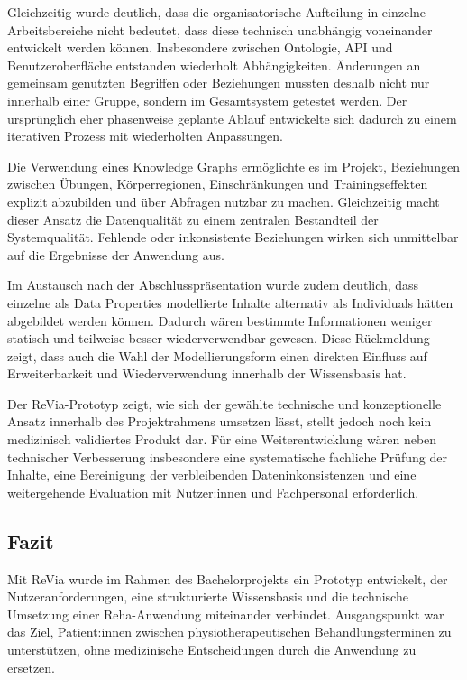 Gleichzeitig wurde deutlich, dass die organisatorische Aufteilung in einzelne Arbeitsbereiche nicht bedeutet, dass diese technisch unabhängig voneinander entwickelt werden können. Insbesondere zwischen Ontologie, API und Benutzeroberfläche entstanden wiederholt Abhängigkeiten. Änderungen an gemeinsam genutzten Begriffen oder Beziehungen mussten deshalb nicht nur innerhalb einer Gruppe, sondern im Gesamtsystem getestet werden. Der ursprünglich eher phasenweise geplante Ablauf entwickelte sich dadurch zu einem iterativen Prozess mit wiederholten Anpassungen.

Die Verwendung eines Knowledge Graphs ermöglichte es im Projekt, Beziehungen zwischen Übungen, Körperregionen, Einschränkungen und Trainingseffekten explizit abzubilden und über Abfragen nutzbar zu machen. Gleichzeitig macht dieser Ansatz die Datenqualität zu einem zentralen Bestandteil der Systemqualität. Fehlende oder inkonsistente Beziehungen wirken sich unmittelbar auf die Ergebnisse der Anwendung aus.

Im Austausch nach der Abschlusspräsentation wurde zudem deutlich, dass einzelne als Data Properties modellierte Inhalte alternativ als Individuals hätten abgebildet werden können. Dadurch wären bestimmte Informationen weniger statisch und teilweise besser wiederverwendbar gewesen. Diese Rückmeldung zeigt, dass auch die Wahl der Modellierungsform einen direkten Einfluss auf Erweiterbarkeit und Wiederverwendung innerhalb der Wissensbasis hat.

Der ReVia-Prototyp zeigt, wie sich der gewählte technische und konzeptionelle Ansatz innerhalb des Projektrahmens umsetzen lässt, stellt jedoch noch kein medizinisch validiertes Produkt dar. Für eine Weiterentwicklung wären neben technischer Verbesserung insbesondere eine systematische fachliche Prüfung der Inhalte, eine Bereinigung der verbleibenden Dateninkonsistenzen und eine weitergehende Evaluation mit Nutzer:innen und Fachpersonal erforderlich.

\subsection{Fazit}

Mit ReVia wurde im Rahmen des Bachelorprojekts ein Prototyp entwickelt, der Nutzeranforderungen, eine strukturierte Wissensbasis und die technische Umsetzung einer Reha-Anwendung miteinander verbindet. Ausgangspunkt war das Ziel, Patient:innen zwischen physiotherapeutischen Behandlungsterminen zu unterstützen, ohne medizinische Entscheidungen durch die Anwendung zu ersetzen.

